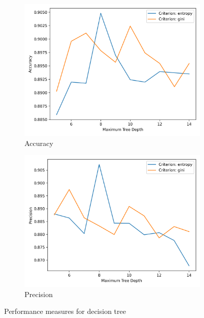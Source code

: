 \documentclass[a4paper,11pt]{article}
\begin{document}
        \begin{figure}[h!]
            \centering
            \begin{subfigure}[c]{0.45\textwidth}
                \centering
                \includegraphics[width=1.1\textwidth]{exercise_1/paper/figures/spambase-accuracy-decision_tree.png}
                \caption{Accuracy}
                \label{fig:decision-tree_spambase_accurracy}
            \end{subfigure}
            \begin{subfigure}[c]{0.45\textwidth}
                \centering
                \includegraphics[width=1\textwidth]{exercise_1/paper/figures/spambase-precision-decision_tree.png}
                \caption{Precision}
                \label{fig:decision-tree_spambase_precision}
            \end{subfigure}
            \caption{Performance measures for decision tree }
            \label{fig:decision-tree_spambase}
        \end{figure}
        
\end{document}
